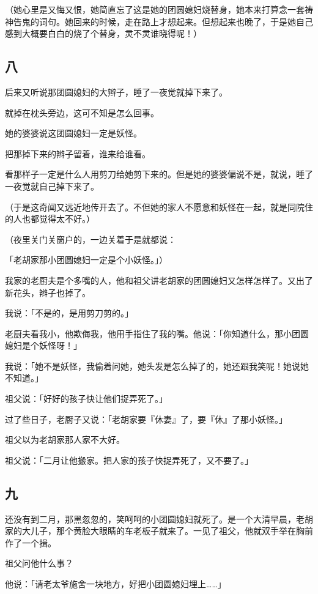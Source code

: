 \documentclass[UTF8]{ctexart}
\begin{document}
（她心里是又悔又恨，她简直忘了这是她的团圆媳妇烧替身，她本来打算念一套祷神告鬼的词句。她回来的时候，走在路上才想起来。但想起来也晚了，于是她自己感到大概要白白的烧了个替身，灵不灵谁晓得呢！）

\subsection{八}

后来又听说那团圆媳妇的大辫子，睡了一夜觉就掉下来了。

就掉在枕头旁边，这可不知是怎么回事。

她的婆婆说这团圆媳妇一定是妖怪。

把那掉下来的辫子留着，谁来给谁看。

看那样子一定是什么人用剪刀给她剪下来的。但是她的婆婆偏说不是，就说，睡了一夜觉就自己掉下来了。

（于是这奇闻又远近地传开去了。不但她的家人不愿意和妖怪在一起，就是同院住的人也都觉得太不好。）

（夜里关门关窗户的，一边关着于是就都说：

「老胡家那小团圆媳妇一定是个小妖怪。」）

我家的老厨夫是个多嘴的人，他和祖父讲老胡家的团圆媳妇又怎样怎样了。又出了新花头，辫子也掉了。

我说：「不是的，是用剪刀剪的。」

老厨夫看我小，他欺侮我，他用手指住了我的嘴。他说：「你知道什么，那小团圆媳妇是个妖怪呀！」

我说：「她不是妖怪，我偷着问她，她头发是怎么掉了的，她还跟我笑呢！她说她不知道。」

祖父说：「好好的孩子快让他们捉弄死了。」

过了些日子，老厨子又说：「老胡家要『休妻』了，要『休』了那小妖怪。」

祖父以为老胡家那人家不大好。

祖父说：「二月让他搬家。{把人家的孩子快捉弄死了，又不要了。}」

\subsection{九}

还没有到二月，那黑忽忽的，笑呵呵的小团圆媳妇就死了。是一个大清早晨，老胡家的大儿子，那个黄脸大眼睛的车老板子就来了。一见了祖父，他就双手举在胸前作了一个揖。

祖父问他什么事？

他说：「请老太爷施舍一块地方，好把小团圆媳妇埋上……」
\end{document}
